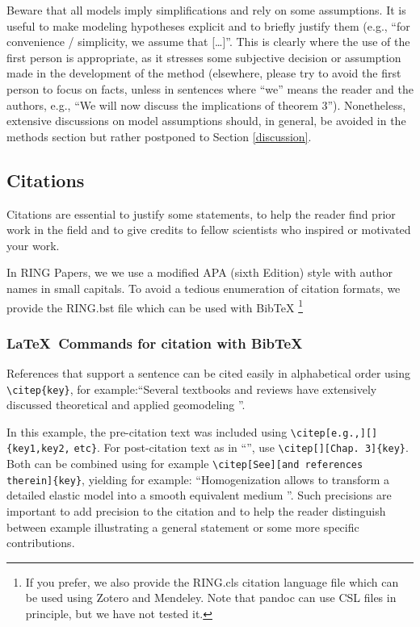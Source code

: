 \documentclass[final]{ring}
\begin{document}
Beware that all models imply simplifications and rely on some assumptions. It is useful to make modeling hypotheses explicit and to briefly justify them (e.g., ``for convenience / simplicity, we assume that […]''. This is clearly where the use of the first person is appropriate, as it stresses some subjective decision or assumption made in the development of the method (elsewhere, please try to avoid the first person to focus on facts, unless in sentences where “we” means the reader and the authors, e.g., “We will now discuss the implications of theorem 3”). Nonetheless, extensive discussions on model assumptions should, in general, be avoided in the methods section but rather postponed to Section \ref{discussion}.

\subsection{Citations}

Citations are essential to justify some statements, to help the reader find prior work in the field and to give credits to fellow scientists who inspired or motivated your work. 

In RING Papers, we we use a modified APA (sixth Edition) style with author names in small capitals. To avoid a tedious enumeration of citation formats, we provide the RING.bst file which can be used with BibTeX \footnote{If you prefer, we also provide the RING.cls citation language file which can be used using Zotero and Mendeley. Note that pandoc can use CSL files in principle, but we have not tested it.}

\subsubsection{\LaTeX\ Commands for citation with BibTeX}

References that support a sentence can be cited easily in alphabetical order using \verb|\citep{key}|, for example:``Several textbooks and reviews have extensively discussed theoretical and applied geomodeling \citep[e.g.,][]{Mallet2002, Mallet2014, Perrin2013, Ringrose2015, Wellmann2018AG}''. 

In this example, the pre-citation text was included using \verb|\citep[e.g.,][]{key1,key2,| \verb|etc}|. For post-citation text as in ``\citep[chap. 3][]{Mallet2002}'', use \verb|\citep[][Chap. 3]{key}|. Both can be combined using for example \verb|\citep[See][and references therein]{key}|, yielding for example: ``Homogenization allows to transform a detailed elastic model into a smooth equivalent medium \citep[See][and references therein]{Capdeville2020AiG}''. Such precisions are important to add precision to the citation and to help the reader distinguish between example illustrating a general statement or some more specific contributions. 
\end{document}
